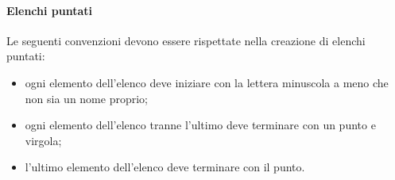                 \paragraph{Elenchi puntati}
                Le seguenti convenzioni devono essere rispettate nella creazione di elenchi puntati:
                \begin{itemize}
                    \item ogni elemento dell'elenco deve iniziare con la lettera minuscola a meno che non sia un nome proprio;
                    \item ogni elemento dell'elenco tranne l'ultimo deve terminare con un punto e virgola;
                    \item l'ultimo elemento dell'elenco deve terminare con il punto.
                \end{itemize}

